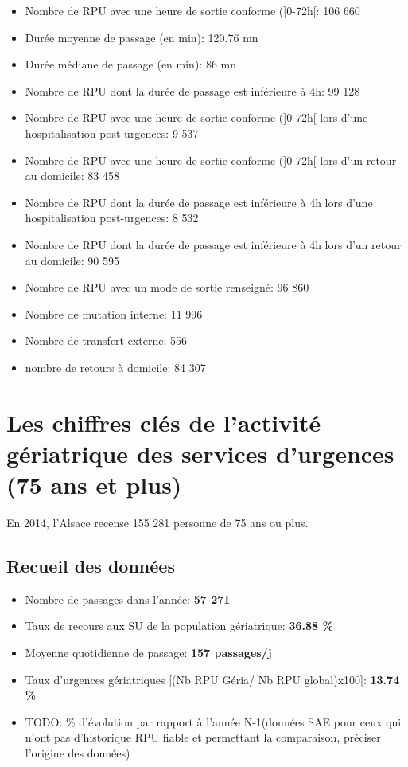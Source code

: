 \documentclass[]{article}
\begin{document}
\begin{itemize}
\item
  Nombre de RPU avec une heure de sortie conforme ({]}0-72h{[}: 106 660
\item
  Durée moyenne de passage (en min): 120.76 mn
\item
  Durée médiane de passage (en min): 86 mn
\item
  Nombre de RPU dont la durée de passage est inférieure à 4h: 99 128
\item
  Nombre de RPU avec une heure de sortie conforme ({]}0-72h{[} lors
  d'une hospitalisation post-urgences: 9 537
\item
  Nombre de RPU avec une heure de sortie conforme ({]}0-72h{[} lors d'un
  retour au domicile: 83 458
\item
  Nombre de RPU dont la durée de passage est inférieure à 4h lors d'une
  hospitalisation post-urgences: 8 532
\item
  Nombre de RPU dont la durée de passage est inférieure à 4h lors d'un
  retour au domicile: 90 595
\item
  Nombre de RPU avec un mode de sortie renseigné: 96 860
\item
  Nombre de mutation interne: 11 996
\item
  Nombre de transfert externe: 556
\item
  nombre de retours à domicile: 84 307
\end{itemize}

\section{Les chiffres clés de l'activité gériatrique des services
d'urgences (75 ans et
plus)}\label{les-chiffres-cles-de-lactivite-geriatrique-des-services-durgences-75-ans-et-plus}

En 2014, l'Alsace recense 155 281 personne de 75 ans ou plus.

\subsection{Recueil des données}\label{recueil-des-donnees-2}

\begin{itemize}
\itemsep1pt\parskip0pt
\item
  Nombre de passages dans l'année: \textbf{57 271}
\item
  Taux de recours aux SU de la population gériatrique: \textbf{36.88 \%}
\item
  Moyenne quotidienne de passage: \textbf{157 passages/j}
\item
  Taux d'urgences gériatriques {[}(Nb RPU Géria/ Nb RPU global)x100{]}:
  \textbf{13.74 \%}
\item
  TODO: \% d'évolution par rapport à l'année N-1(données SAE pour ceux
  qui n'ont pas d'historique RPU fiable et permettant la comparaison,
  préciser l'origine des données)
\end{itemize}
\end{document}
